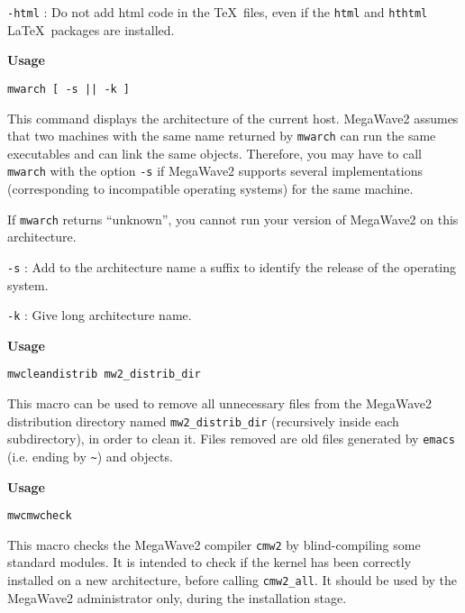 \verb=-html= : Do not add html code in the \TeX\ files, even if the \verb+html+ and
\verb+hthtml+ \LaTeX\ packages are installed.

\newpage

{\Large\bf Usage} \bigskip

\verb+mwarch [ -s || -k ]+

\Next

\Description
This command displays the architecture of the current host.
MegaWave2 assumes that two machines with the same name returned by \verb+mwarch+ can run the same executables and can link the same objects.
Therefore, you may have to call \verb+mwarch+ with the option \verb+-s+ if MegaWave2 supports
several implementations (corresponding to incompatible operating systems) for the same
machine.

If \verb+mwarch+ returns ``unknown'', you cannot run your version of MegaWave2 on this architecture.

\Next

\Options

\verb+-s+ : Add to the architecture name a suffix to identify the release of the operating system.

\verb+-k+ : Give long architecture name.

\newpage

{\Large\bf Usage} \bigskip

\verb+mwcleandistrib mw2_distrib_dir+

\Next

\Description
This macro can be used to remove all unnecessary files from the MegaWave2 distribution directory
named \verb+mw2_distrib_dir+ (recursively inside each subdirectory), in order to clean it.
Files removed are old files generated by \verb+emacs+ (i.e. ending by \verb+~+) and objects.

\Next

\newpage

{\Large\bf Usage} \bigskip

\verb+mwcmwcheck+

\Next

\Description
This macro checks the MegaWave2 compiler \verb+cmw2+ by blind-compiling some standard
modules. It is intended to check if the kernel has been correctly installed on a new
architecture, before calling \verb+cmw2_all+.
It should be used by the MegaWave2 administrator only, during the installation stage.

